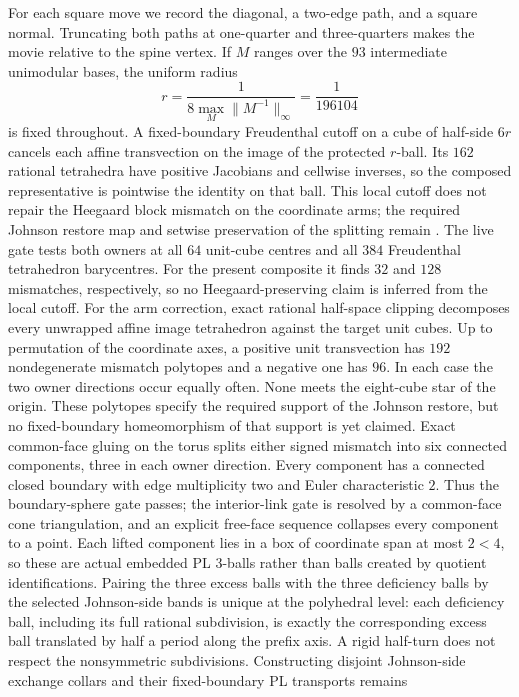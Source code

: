 For each square move we record the diagonal, a two-edge path, and a square
normal.  Truncating both paths at one-quarter and three-quarters makes the
movie relative to the spine vertex.  If $M$ ranges over the $93$ intermediate
unimodular bases, the uniform radius
\[
r=\frac{1}{8\max_M\lVert M^{-1}\rVert_\infty}=\frac1{196104}
\]
is fixed throughout.  A fixed-boundary Freudenthal cutoff on a cube of
half-side $6r$ cancels each affine transvection on the image of the
protected $r$-ball.  Its $162$ rational tetrahedra have positive
Jacobians and cellwise inverses, so the composed representative is pointwise
the identity on that ball.  This local cutoff does not repair the Heegaard
block mismatch on the coordinate arms; the required Johnson restore map and
setwise preservation of the splitting remain \Open.
The live gate tests both owners at all $64$ unit-cube centres and all $384$
Freudenthal tetrahedron barycentres.  For the present composite it finds $32$
and $128$ mismatches, respectively, so no Heegaard-preserving claim is
inferred from the local cutoff.
For the arm correction, exact rational half-space clipping decomposes every
unwrapped affine image tetrahedron against the target unit cubes.  Up to
permutation of the coordinate axes, a positive unit transvection has $192$
nondegenerate mismatch polytopes and a negative one has $96$.  In each case
the two owner directions occur equally often.  None meets the eight-cube
star of the origin.  These polytopes specify the required support of the
Johnson restore, but no fixed-boundary homeomorphism of that support is yet
claimed.  Exact common-face gluing on the torus splits either signed mismatch
into six connected components, three in each owner direction.  Every component
has a connected closed boundary with edge multiplicity two and Euler
characteristic $2$.  Thus the boundary-sphere gate passes; the interior-link
gate is resolved by a common-face cone triangulation, and an explicit
free-face sequence collapses every component to a point.  Each lifted
component lies in a box of coordinate span at most $2<4$, so these are actual
embedded PL $3$-balls rather than balls created by quotient identifications.
Pairing the three excess balls with the three deficiency balls by the selected
Johnson-side bands is unique at the polyhedral level: each deficiency ball,
including its full rational subdivision, is exactly the corresponding excess
ball translated by half a period along the prefix axis.  A rigid half-turn
does not respect the nonsymmetric subdivisions.  Constructing disjoint
Johnson-side exchange collars and their fixed-boundary PL transports remains
